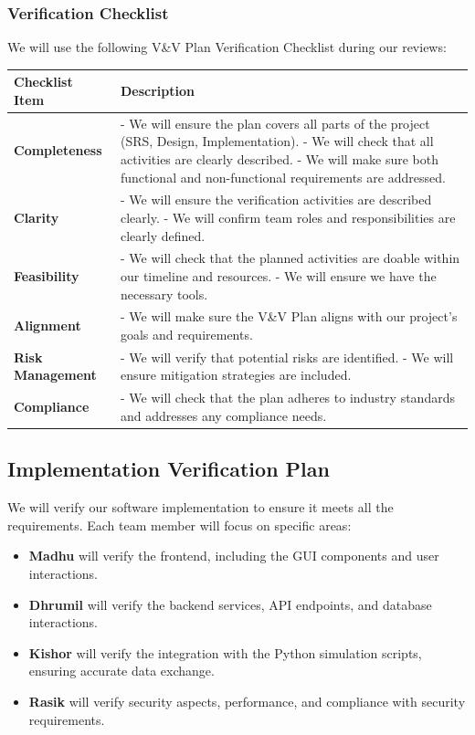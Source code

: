 \documentclass[12pt, titlepage]{article}
\begin{document}
\subsubsection{Verification Checklist}

We will use the following V\&V Plan Verification Checklist during our reviews:

\begin{longtable}{|p{}|p{}|}
  \hline
  \textbf{Checklist Item} & \textbf{Description} \\ \hline
  \textbf{Completeness} & 
  - We will ensure the plan covers all parts of the project (SRS, Design, Implementation). \newline
  - We will check that all activities are clearly described. \newline
  - We will make sure both functional and non-functional requirements are addressed. \\ \hline
  \textbf{Clarity} & 
  - We will ensure the verification activities are described clearly. \newline
  - We will confirm team roles and responsibilities are clearly defined. \\ \hline
  \textbf{Feasibility} & 
  - We will check that the planned activities are doable within our timeline and resources. \newline
  - We will ensure we have the necessary tools. \\ \hline
  \textbf{Alignment} & 
  - We will make sure the V\&V Plan aligns with our project's goals and requirements. \\ \hline
  \textbf{Risk Management} & 
  - We will verify that potential risks are identified. \newline
  - We will ensure mitigation strategies are included. \\ \hline
  \textbf{Compliance} & 
  - We will check that the plan adheres to industry standards and addresses any compliance needs. \\ \hline
  \end{longtable}


\subsection{Implementation Verification Plan}

We will verify our software implementation to ensure it meets all the requirements. Each team member will focus on specific areas:
\begin{itemize}
    \item \textbf{Madhu} will verify the frontend, including the GUI components and user interactions.
    \item \textbf{Dhrumil} will verify the backend services, API endpoints, and database interactions.
    \item \textbf{Kishor} will verify the integration with the Python simulation scripts, ensuring accurate data exchange.
    \item \textbf{Rasik} will verify security aspects, performance, and compliance with security requirements.
\end{itemize}
\end{document}
